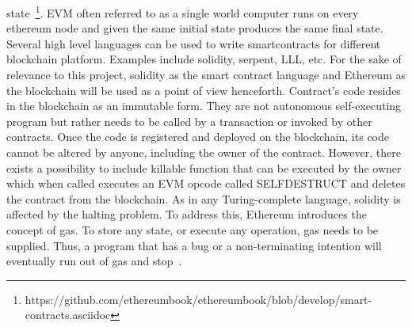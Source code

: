 state~\footnote{https://github.com/ethereumbook/ethereumbook/blob/develop/smart-contracts.asciidoc}.
EVM often referred to as a single world computer runs on every ethereum node
and given the same initial state produces the same final state. Several high
level languages can be used to write smartcontracts for different blockchain
platform. Examples include solidity, serpent, LLL, etc.  For the sake of
relevance to this project, solidity as the smart contract language and Ethereum
as the blockchain will be used as a point of view henceforth. Contract's code
resides in the blockchain as an immutable form.  They are not autonomous
self-executing program but rather needs to be called by a transaction or
invoked by other contracts. Once the code is registered and deployed on the
blockchain, its code cannot be altered by anyone, including the owner of the
contract. However, there exists a possibility to include killable function that
can be executed by the owner which when called executes an EVM opcode called
SELFDESTRUCT and deletes the contract from the blockchain.  As in any
Turing-complete language, solidity is affected by the halting problem.  To
address this, Ethereum introduces the concept of gas. To store any state, or
execute any operation, gas needs to be supplied. Thus, a program that has a bug
or a non-terminating intention will eventually run out of gas and
stop~\cite{whataresmartcontracts}.





